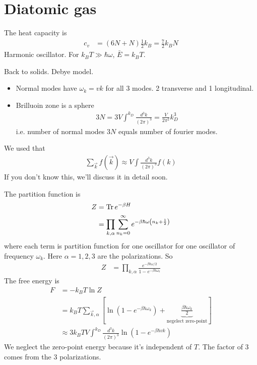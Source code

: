 \section{Diatomic gas}
The heat capacity is
\begin{align}
    c_v &= (6N + N)\frac{1}{2}k_B = \frac{7}{2}k_B N
\end{align}
Harmonic oscillator.
For $k_B T \gg \hbar\omega$, $\bar{E} = k_B T$.

Back to solids.
Debye model.
\begin{itemize}
    \item Normal modes have $\omega_k=v k$ for all 3 modes.
        2 transverse and 1 longitudinal.
    \item Brilluoin zone is a sphere
        \begin{align}
            3N = 3V \int^{k_D} \frac{d^3 k}{(2\pi)^3}
            =
            \frac{V}{2\pi^2} k_D^3
        \end{align}
        i.e. number of normal modes $3N$ equals number of fourier modes.
\end{itemize}
We used that
\begin{align}
    \sum_{\vec{k}} f(\vec{k}) \approx
    V \int \frac{d^3k}{(2\pi)^3} f(k)
\end{align}
If you don't know this,
we'll discuss it in detail soon.

The partition function is
\begin{align}
    Z &= \Tr e^{-\beta H}\\
    &=
    \prod_{k,\alpha}\sum_{n_k=0}^{\infty} e^{-\beta\hbar\omega\left( n_k +
    \frac{1}{2}
    \right)}
\end{align}
where each term is partition function for one oscillator for one oscillator of
frequency $\omega_k$.
Here $\alpha = 1,2,3$
are the polarizations.
So
\begin{align}
    Z &=
    \prod_{k,\alpha}
    \frac{e^{-\beta\hbar\omega/2}}{1 - e^{-\beta\hbar\omega_k}}
\end{align}
The free energy is
\begin{align}
    F &= -k_B T\ln Z\\
    &=
    k_B T
    \sum_{\vec{k},\alpha}
    \left[
    \ln\left( 1 - e^{-\beta\hbar\omega_k} \right)
    +
    \underbrace{\frac{\beta\hbar\omega_k}{2}}_{\textrm{negelect zero-point}}
    \right]\\
    &\approx
    3 k_B T V \int^{k_D} \frac{d^3k}{{(2\pi)}^3}
    \ln\left( 1 - e^{-\beta\hbar vk} \right)
\end{align}
We neglect the zero-point energy because it's independent of $T$.
The factor of 3 comes from the 3 polarizations.

